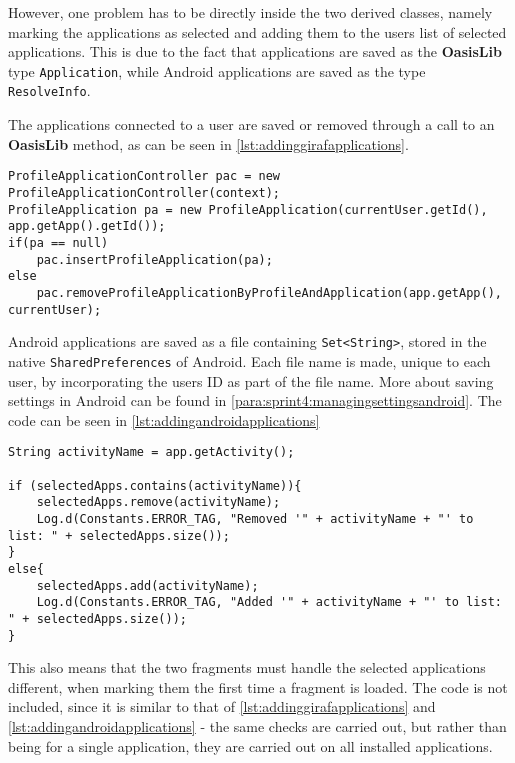 However, one problem has to be directly inside the two derived classes, namely marking the applications as selected and adding them to the users list of selected applications.
This is due to the fact that \giraf applications are saved as the \textbf{OasisLib} type \lstinline!Application!, while Android applications are saved as the type \lstinline!ResolveInfo!.

The \giraf applications connected to a user are saved or removed through a call to an \textbf{OasisLib} method, as can be seen in \cref{lst:addinggirafapplications}.

\begin{lstlisting}[caption={The methods used for adding or removing a Giraf application to a user}, label={lst:addinggirafapplications}]
ProfileApplicationController pac = new ProfileApplicationController(context);
ProfileApplication pa = new ProfileApplication(currentUser.getId(), app.getApp().getId());
if(pa == null)
	pac.insertProfileApplication(pa);
else
	pac.removeProfileApplicationByProfileAndApplication(app.getApp(), currentUser);
\end{lstlisting}

Android applications are saved as a file containing \lstinline!Set<String>!, stored in the native \lstinline!SharedPreferences! of Android.
Each file name is made, unique to each user, by incorporating the users ID as part of the file name.
More about saving settings in Android can be found in \cref{para:sprint4:managingsettingsandroid}.
The code can be seen in \cref{lst:addingandroidapplications}\\

\begin{lstlisting}[caption={The methods used for adding or removing a Giraf application to a user}, label={lst:addingandroidapplications}]
String activityName = app.getActivity();

if (selectedApps.contains(activityName)){
    selectedApps.remove(activityName);
    Log.d(Constants.ERROR_TAG, "Removed '" + activityName + "' to list: " + selectedApps.size());
}
else{
    selectedApps.add(activityName);
    Log.d(Constants.ERROR_TAG, "Added '" + activityName + "' to list: " + selectedApps.size());
}
\end{lstlisting}

This also means that the two fragments must handle the selected applications different, when marking them the first time a fragment is loaded.
The code is not included, since it is similar to that of \cref{lst:addinggirafapplications} and \cref{lst:addingandroidapplications} - the same checks are carried out, but rather than being for a single application, they are carried out on all installed applications.